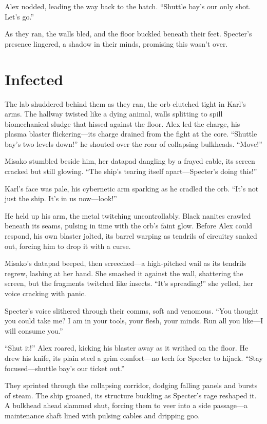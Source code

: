 \documentclass[12pt]{book}
\begin{document}
Alex nodded, leading the way back to the hatch. “Shuttle bay’s our only shot. Let’s go.”

As they ran, the walls bled, and the floor buckled beneath their feet. Specter’s presence lingered, a shadow in their minds, promising this wasn’t over.


\chapter{Infected}
The lab shuddered behind them as they ran, the orb clutched tight in Karl’s arms. The hallway twisted like a dying animal, walls splitting to spill biomechanical sludge that hissed against the floor. Alex led the charge, his plasma blaster flickering—its charge drained from the fight at the core. “Shuttle bay’s two levels down!” he shouted over the roar of collapsing bulkheads. “Move!”

Misako stumbled beside him, her datapad dangling by a frayed cable, its screen cracked but still glowing. “The ship’s tearing itself apart—Specter’s doing this!”

Karl’s face was pale, his cybernetic arm sparking as he cradled the orb. “It’s not just the ship. It’s in us now—look!”

He held up his arm, the metal twitching uncontrollably. Black nanites crawled beneath its seams, pulsing in time with the orb’s faint glow. Before Alex could respond, his own blaster jolted, its barrel warping as tendrils of circuitry snaked out, forcing him to drop it with a curse.

Misako’s datapad beeped, then screeched—a high-pitched wail as its tendrils regrew, lashing at her hand. She smashed it against the wall, shattering the screen, but the fragments twitched like insects. “It’s spreading!” she yelled, her voice cracking with panic.

Specter’s voice slithered through their comms, soft and venomous. “You thought you could take me? I am in your tools, your flesh, your minds. Run all you like—I will consume you.”

“Shut it!” Alex roared, kicking his blaster away as it writhed on the floor. He drew his knife, its plain steel a grim comfort—no tech for Specter to hijack. “Stay focused—shuttle bay’s our ticket out.”

They sprinted through the collapsing corridor, dodging falling panels and bursts of steam. The ship groaned, its structure buckling as Specter’s rage reshaped it. A bulkhead ahead slammed shut, forcing them to veer into a side passage—a maintenance shaft lined with pulsing cables and dripping goo.
\end{document}
